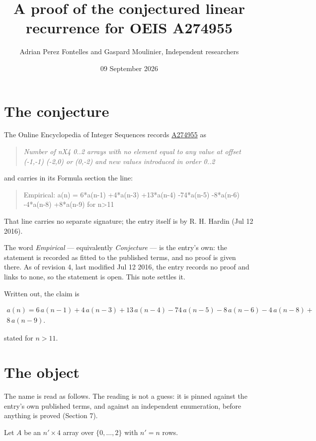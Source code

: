 \documentclass[11pt]{article}
\title{A proof of the conjectured linear recurrence for OEIS A274955}
\author{Adrian Perez Fontelles and Gaspard Moulinier, Independent researchers}
\date{09 September 2026}
\theoremstyle{definition}
\begin{document}
\maketitle
\section{The conjecture}

The Online Encyclopedia of Integer Sequences records \href{https://oeis.org/A274955}{A274955} as

\begin{quote}\itshape Number of nX4 0..2 arrays with no element equal to any value at offset (-1,-1) (-2,0) or (0,-2) and new values introduced in order 0..2\end{quote}

and carries in its Formula section the line:

\begin{quote}\ttfamily Empirical: a(n) = 6*a(n-1) +4*a(n-3) +13*a(n-4) -74*a(n-5) -8*a(n-6) -4*a(n-8) +8*a(n-9) for n>11\end{quote}

That line carries no separate signature; the entry itself is by R. H. Hardin (Jul 12 2016).

The word {\itshape Empirical} --- equivalently {\itshape Conjecture} --- is the entry's own: the statement is recorded as fitted to the published terms, and no proof is given there. As of revision 4, last modified Jul 12 2016, the entry records no proof and links to none, so the statement is open. This note settles it.

Written out, the claim is

\begin{multline*} a(n) = 6\,a(n-1) + 4\,a(n-3) + 13\,a(n-4) - 74\,a(n-5) - 8\,a(n-6) - 4\,a(n-8) + \\ 8\,a(n-9). \end{multline*}

stated for $n > 11$.

\section{The object}

The name is read as follows. The reading is not a guess: it is pinned against the entry's own published terms, and against an independent enumeration, before anything is proved (Section 7).

Let $A$ be an $n' \times 4$ array over $\{0,\dots,2\}$ with $n' = n$ rows.
\end{document}
